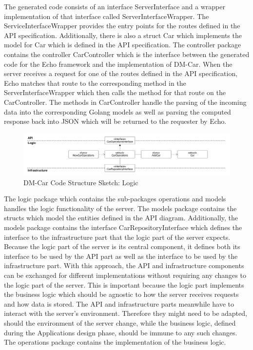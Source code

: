 

The generated code consists of
an interface ServerInterface and a wrapper implementation of that interface
called ServerInterfaceWrapper. The ServiceInterfaceWrapper provides the entry
points for the routes defined in the API specification. Additionally, there is
also a struct Car which implements the model for Car which is defined in the
API specification. 
The controller package contains the controller CarController
which is the interface between the generated code for the Echo framework and
the implementation of DM-Car. When the server receives a request for one of the
routes defined in the API specification, Echo matches that route to the
corresponding method in the ServerInterfaceWrapper which then calls the method
for that route on the CarController. The methods in CarController handle the
parsing of the incoming data into the corresponding Golang models as well as
parsing the computed response back into JSON which will be returned to the
requester by Echo.

\begin{figure}[h]
	\centering
	\includegraphics[width=\textwidth]{figures/dm_car_css_logic.png}
	\caption{DM-Car Code Structure Sketch: Logic}
	\label{fig:dm_car_css_logic}
\end{figure}

The logic package which contains the sub-packages operations and models handles
the logic functionality of the server. The models package contains the structs
which model the entities defined in the API diagram. Additionally, the models
package contains the interface CarRepositoryInterface which defines the
interface to the infrastructure part that the logic part of the server expects.
Because the logic part of the server is its central component, it defines both
its interface to be used by the API part as well as the interface to be used by
the infrastructure part. With this approach, the API and infrastructure
components can be exchanged for different implementations without requiring any
changes to the logic part of the server. This is important because the logic
part implements the business logic which should be agnostic to how the server
receives requests and how data is stored. The API and infrastructure parts
meanwhile have to interact with the server's environment. Therefore they might
need to be adapted, should the environment of the server change, while the
business logic, defined during the Applications design phase, should be immune
to any such changes. The operations package contains the implementation of the
business logic.

